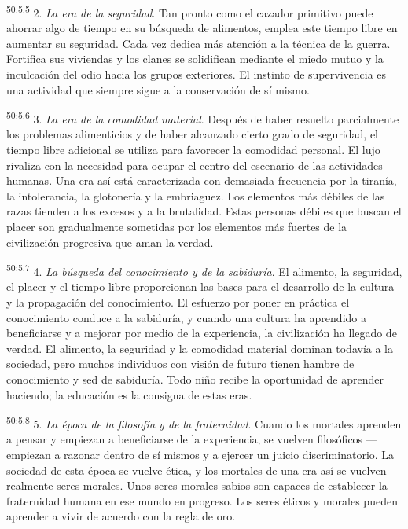 \par
\textsuperscript{50:5.5} 2. \textit{La era de la seguridad}. Tan pronto como el cazador primitivo puede ahorrar algo de tiempo en su búsqueda de alimentos, emplea este tiempo libre en aumentar su seguridad. Cada vez dedica más atención a la técnica de la guerra. Fortifica sus viviendas y los clanes se solidifican mediante el miedo mutuo y la inculcación del odio hacia los grupos exteriores. El instinto de supervivencia es una actividad que siempre sigue a la conservación de sí mismo.

\par
\textsuperscript{50:5.6} 3. \textit{La era de la comodidad material}. Después de haber resuelto parcialmente los problemas alimenticios y de haber alcanzado cierto grado de seguridad, el tiempo libre adicional se utiliza para favorecer la comodidad personal. El lujo rivaliza con la necesidad para ocupar el centro del escenario de las actividades humanas. Una era así está caracterizada con demasiada frecuencia por la tiranía, la intolerancia, la glotonería y la embriaguez. Los elementos más débiles de las razas tienden a los excesos y a la brutalidad. Estas personas débiles que buscan el placer son gradualmente sometidas por los elementos más fuertes de la civilización progresiva que aman la verdad.

\par
\textsuperscript{50:5.7} 4. \textit{La búsqueda del conocimiento y de la sabiduría}. El alimento, la seguridad, el placer y el tiempo libre proporcionan las bases para el desarrollo de la cultura y la propagación del conocimiento. El esfuerzo por poner en práctica el conocimiento conduce a la sabiduría, y cuando una cultura ha aprendido a beneficiarse y a mejorar por medio de la experiencia, la civilización ha llegado de verdad. El alimento, la seguridad y la comodidad material dominan todavía a la sociedad, pero muchos individuos con visión de futuro tienen hambre de conocimiento y sed de sabiduría. Todo niño recibe la oportunidad de aprender haciendo; la educación es la consigna de estas eras.

\par
\textsuperscript{50:5.8} 5. \textit{La época de la filosofía y de la fraternidad}. Cuando los mortales aprenden a pensar y empiezan a beneficiarse de la experiencia, se vuelven filosóficos ---empiezan a razonar dentro de sí mismos y a ejercer un juicio discriminatorio. La sociedad de esta época se vuelve ética, y los mortales de una era así se vuelven realmente seres morales. Unos seres morales sabios son capaces de establecer la fraternidad humana en ese mundo en progreso. Los seres éticos y morales pueden aprender a vivir de acuerdo con la regla de oro.

